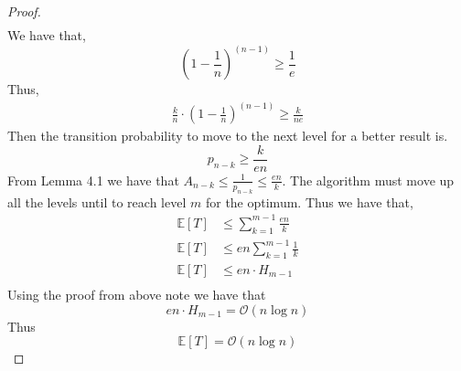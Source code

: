 \documentclass[a4paper, 12pt]{article}
\begin{document}
\begin{proof}
\begin{align*}
        \end{align*}
        We have that,
        \begin{equation*}
            \left(1-\frac{1}{n}\right)^{(n-1)}\geq\frac{1}{e}
        \end{equation*}
        Thus,
        \begin{align*}
            \frac{k}{n}\cdot\left(1 - \frac{1}{n}\right)^{(n-1)}\geq\frac{k}{ne}
        \end{align*}
        Then the transition probability to move to the next level for a better result is.
        \begin{equation*}
            p_{n-k} \geq \frac{k}{en}
        \end{equation*} 
        From Lemma 4.1\cite[p.45]{NeumannWitt2010} we have that $A_{n-k}\leq\frac{1}{p_{n-k}}\leq\frac{en}{k}$. The algorithm must move up all the levels
        until to reach level $m$ for the optimum. Thus we have that,
        \begin{align*}
            \mathbb{E}[T]&\leq\sum_{k=1}^{m-1}\frac{en}{k}\\
            \mathbb{E}[T]&\leq en\sum_{k=1}^{m-1}\frac{1}{k}\\
            \mathbb{E}[T]&\leq en\cdot H_{m-1}\\
        \end{align*}
        Using the proof from above note we have that
        \begin{equation*}
            en\cdot H_{m-1} = \mathcal{O}(n\log n)
        \end{equation*}
        Thus
        \begin{equation*}
            \mathbb{E}[T]=\mathcal{O}(n\log n)
        \end{equation*}
    \end{proof}
\newpage
\printbibliography
\end{document}
